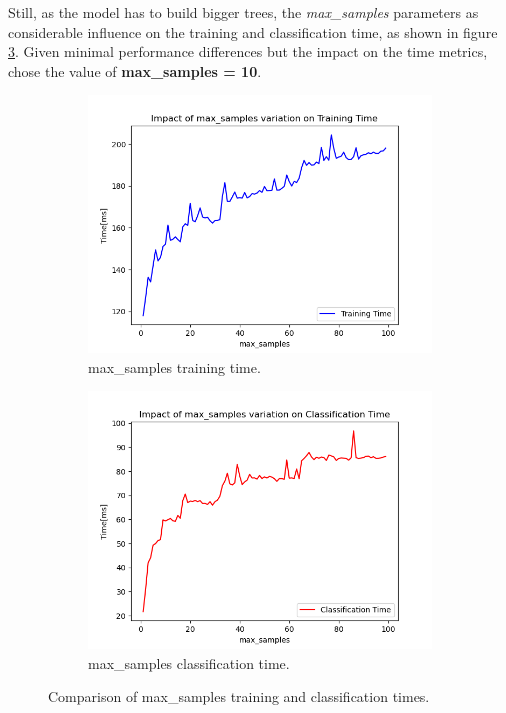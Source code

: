 \documentclass[futureinternet,article,submit,pdftex,moreauthors]{Definitions/mdpi}
\begin{document}
Still, as the model has to build bigger trees, the \textit{max\_samples} parameters as considerable influence on the training and classification time, as shown in figure \ref{fig:max_samples_time_comparison}.
Given minimal performance differences but the impact on the time metrics, chose the value of \textbf{max\_samples = 10}. 

\begin{figure}[H]
	\centering
	\begin{subfigure}{0.45\textwidth}
		\centering
		\includegraphics[width=\textwidth]{img/maxSamplesTrainingTime.png}
		\caption{max\_samples training time.}
		\label{fig:max_samples_training_time}
	\end{subfigure}
	\hfill
	\begin{subfigure}{0.45\textwidth}
		\centering
		\includegraphics[width=\textwidth]{img/maxSamplesClassificationTime.png}
		\caption{max\_samples classification time.}
		\label{fig:max_samples_classification_time}
	\end{subfigure}
	\caption{Comparison of max\_samples training and classification times.}
	\label{fig:max_samples_time_comparison}
\end{figure}
\end{document}
